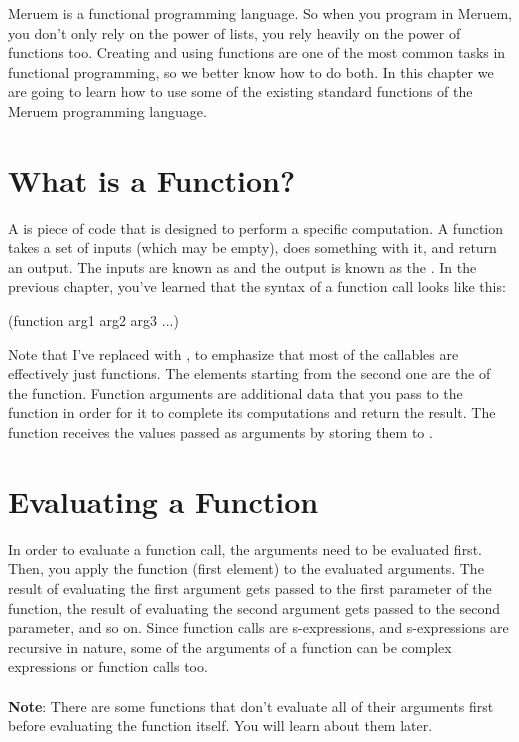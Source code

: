 Meruem is a functional programming language. So when you program in Meruem, you don't only rely on the power of lists, you rely heavily on the power of functions too. Creating and using functions are one of the most common tasks in functional programming, so we better know how to do both. In this chapter we are going to learn how to use some of the existing standard functions of the Meruem programming language.

\section{What is a Function?}
A  is piece of code that is designed to perform a specific computation. A function takes a set of inputs (which may be empty), does something with it, and return an output. The inputs are known as  and the output is known as the . In the previous chapter, you've learned that the syntax of a function call looks like this:

\begin{QuasiLang}
(function arg1 arg2 arg3 ...)
\end{QuasiLang}

Note that I've replaced  with , to emphasize that most of the callables are effectively just functions. The elements starting from the second one are the  of the function. Function arguments are additional data that you pass to the function in order for it to complete its computations and return the result. The function receives the values passed as arguments by storing them to .

\section{Evaluating a Function}
In order to evaluate a function call, the arguments need to be evaluated first. Then, you apply the function (first element) to the evaluated arguments. The result of evaluating the first argument gets passed to the first parameter of the function, the result of evaluating the second argument gets passed to the second parameter, and so on. Since function calls are s-expressions, and s-expressions are recursive in nature, some of the arguments of a function can be complex expressions or function calls too. 
\\~\\
\textbf{Note}: There are some functions that don't evaluate all of their arguments first before evaluating the function itself. You will learn about them later.


